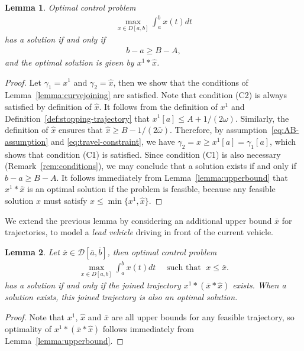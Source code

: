 \documentclass[a4paper]{article}
\theoremstyle{definition}
\theoremstyle{plain}
\newtheorem{lemma}{Lemma\hspace{0.25em}\ignorespaces}
\begin{document}
\begin{lemma}
  Optimal control problem
  \begin{align}
    \max_{x \in D[a,b]} \int_{a}^{b} x(t) dt
  \end{align}
  has a solution if and only if
  \begin{align}\label{eq:travel-constraint}
    b-a \geq B-A ,
  \end{align}
  and the optimal solution is given
  by $x^{1} * \hat{x}$.
\end{lemma}
\begin{proof}
  Let $\gamma_{1} = x^{1}$ and $\gamma_{2} = \hat{x}$, then we show that the
  conditions of Lemma~\ref{lemma:curvejoining} are satisfied. Note that
  condition (C2) is always satisfied by definition of $\hat{x}$.
  It follows from the definition of $x^{1}$ and
  Definition~\ref{def:stopping-trajectory} that $x^{1}[a] \leq A + 1/(2\omega)$.
  Similarly, the definition of $\hat{x}$ ensures that
  $\hat{x} \geq B - 1/(2\bar{\omega})$. Therefore, by
  assumption~\eqref{eq:AB-assumption} and \eqref{eq:travel-constraint}, we have
  $\gamma_{2} = \hat{x} \geq x^{1}[a] = \gamma_{1}[a]$, which shows that
  condition (C1) is satisfied.
  Since condition (C1) is also necessary (Remark~\ref{rem:conditions}), we may
  conclude that a solution exists if and only if $b-a \geq B-A$. It follows
  immediately from Lemma~\ref{lemma:upperbound} that $x^{1} * \hat{x}$ is an
  optimal solution if the problem is feasible, because any feasible solution $x$
  must satisfy $x \leq \min\{x^{1}, \hat{x}\}$.
\end{proof}

We extend the previous lemma by considering an additional upper bound $\bar{x}$
for trajectories, to model a \emph{lead vehicle} driving in front of the current
vehicle.

\begin{lemma}\label{lemma:lead-constraint}
  Let $\bar{x} \in \mathcal{D}[\bar{a}, \bar{b}]$, then optimal control
  problem
  \begin{align}
    \max_{x \in D[a,b]} \int_{a}^{b} x(t) dt \quad \text{ such that } \; x \leq \bar{x} .
  \end{align}
  has a solution if and only if the joined trajectory
  $x^{1} * (\bar{x} * \hat{x})$ exists. When a solution exists, this joined
  trajectory is also an optimal solution.
\end{lemma}
\begin{proof}
  Note that $x^{1}$, $\hat{x}$ and $\bar{x}$ are all upper bounds for any
  feasible trajectory, so optimality of $x^{1} * (\bar{x} * \hat{x})$ follows
  immediately from Lemma~\ref{lemma:upperbound}.
\end{proof}
\end{document}

